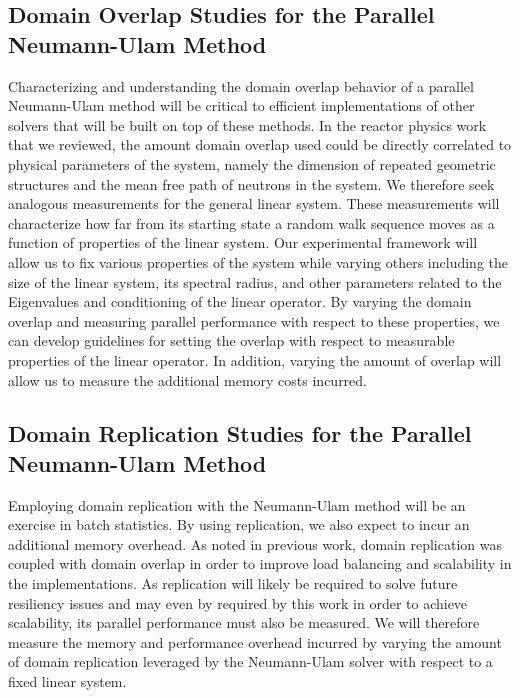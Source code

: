 \subsection{Domain Overlap Studies for the Parallel Neumann-Ulam
  Method}
\label{subsec:domain_overlap_studies}
Characterizing and understanding the domain overlap behavior of a
parallel Neumann-Ulam method will be critical to efficient
implementations of other solvers that will be built on top of these
methods. In the reactor physics work that we reviewed, the amount
domain overlap used could be directly correlated to physical
parameters of the system, namely the dimension of repeated geometric
structures and the mean free path of neutrons in the system. We
therefore seek analogous measurements for the general linear
system. These measurements will characterize how far from its starting
state a random walk sequence moves as a function of properties of the
linear system. Our experimental framework will allow us to fix various
properties of the system while varying others including the size of
the linear system, its spectral radius, and other parameters related
to the Eigenvalues and conditioning of the linear operator. By
varying the domain overlap and measuring parallel performance with
respect to these properties, we can develop guidelines for setting the
overlap with respect to measurable properties of the linear
operator. In addition, varying the amount of overlap will allow us to
measure the additional memory costs incurred. 

\subsection{Domain Replication Studies for the Parallel Neumann-Ulam
  Method}
\label{subsec:domain_replication_studies}
Employing domain replication with the Neumann-Ulam method will be an
exercise in batch statistics. By using replication, we also expect to
incur an additional memory overhead. As noted in previous work, domain
replication was coupled with domain overlap in order to improve load
balancing and scalability in the implementations. As replication will
likely be required to solve future resiliency issues and may even by
required by this work in order to achieve scalability, its parallel
performance must also be measured. We will therefore measure the
memory and performance overhead incurred by varying the amount of
domain replication leveraged by the Neumann-Ulam solver with respect
to a fixed linear system.

